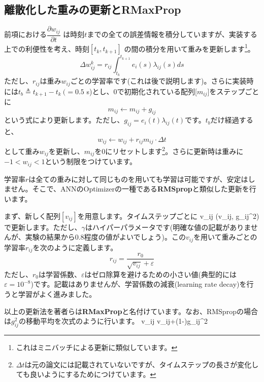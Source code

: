 \subsection{離散化した重みの更新とRMaxProp}
前項における$\dfrac{\partial w_{ij}}{\partial t}$ は時刻$t$までの全ての誤差情報を積分していますが、実装する上での利便性を考え、時刻$[t_k, t_{k+1}]$ の間の積分を用いて重みを更新します\footnote{これはミニバッチによる更新に類似しています。}。
\begin{equation}
\Delta w_{i j}^{k}=r_{ij} \int_{t_{k}}^{t_{k+1}} e_{i}(s) \lambda_{ij}(s) ds      
\end{equation}
ただし、$r_{ij}$は重み$w_{ij}$ごとの学習率です(これは後で説明します)。さらに実装時には$t_b\triangleq{t_{k+1}}-{t_{k}}\ (=0.5$ s)とし、0で初期化されている配列[$m_{ij}$]をステップごとに
\begin{equation}
m_{ij} \leftarrow m_{ij} + g_{ij}    
\end{equation}
という式により更新します。ただし、$g_{ij}=e_{i}(t) \lambda_{ij}(t)$です。$t_b$だけ経過すると、
\begin{equation}
w_{ij} \leftarrow w_{ij} + r_{ij}m_{ij}\cdot \Delta t
\end{equation}
として重み$w_{ij}$を更新し、$m_{ij}$を0にリセットします\footnote{$\Delta t$は元の論文には記載されていないですが、タイムステップの長さが変化しても良いようにするためにつけています。}。さらに更新時は重みに$-1<w_{ij}<1$という制限をつけています。\par
学習率$r$は全ての重みに対して同じものを用いても学習は可能ですが、安定はしません。そこで、ANNのOptimizerの一種である\textbf{RMSprop}と類似した更新を行います。\par
まず、新しく配列$[v_{ij}]$を用意します。タイムステップごとに
v_{ij} \leftarrow \max(\gamma v_{ij}, g_{ij}^2)
で更新します。ただし、$\gamma$はハイパーパラメータです(明確な値の記載がありませんが、実験の結果から0.8程度の値がよいでしょう)。この$v_{ij}$を用いて重みごとの学習率$r_{ij}$を次のように定義します。
\begin{equation}
r_{ij}=\frac{r_0}{\sqrt{v_{ij}}+\varepsilon}
\end{equation}
ただし、$r_0$は学習係数、$\varepsilon$はゼロ除算を避けるための小さい値(典型的には$\varepsilon=10^{-8}$)です。記載はありませんが、学習係数の減衰(learning rate decay)を行うと学習がよく進みました。\par
以上の更新法を著者らは\textbf{RMaxProp}と名付けています。なお、RMSpropの場合は$g_{ij}^2$の移動平均を次式のように行います。
v_{ij} \leftarrow \gamma v_{ij}+(1-\gamma)\cdot g_{ij}^2
